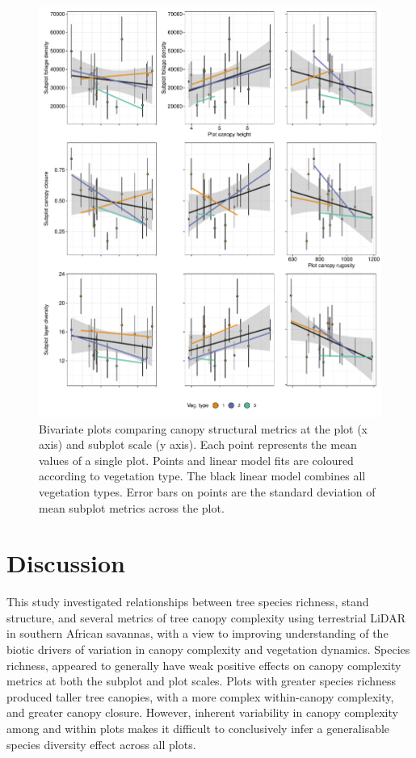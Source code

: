 \documentclass[11pt,a4paper]{article}
\begin{document}
\begin{figure}
	\includegraphics[width=\linewidth]{plot_subplot_bivar}
	\caption{Bivariate plots comparing canopy structural metrics at the plot (x axis) and subplot scale (y axis). Each point represents the mean values of a single plot. Points and linear model fits are coloured according to vegetation type. The black linear model combines all vegetation types. Error bars on points are the standard deviation of mean subplot metrics across the plot.}
	\label{plot_subplot_bivar}
\end{figure}

\section{Discussion}

This study investigated relationships between tree species richness, stand structure, and several metrics of tree canopy complexity using terrestrial LiDAR in southern African savannas, with a view to improving understanding of the biotic drivers of variation in canopy complexity and vegetation dynamics. Species richness, appeared to generally have weak positive effects on canopy complexity metrics at both the subplot and plot scales. Plots with greater species richness produced taller tree canopies, with a more complex within-canopy complexity, and greater canopy closure. However, inherent variability in canopy complexity among and within plots makes it difficult to conclusively infer a generalisable species diversity effect across all plots. 
\end{document}
